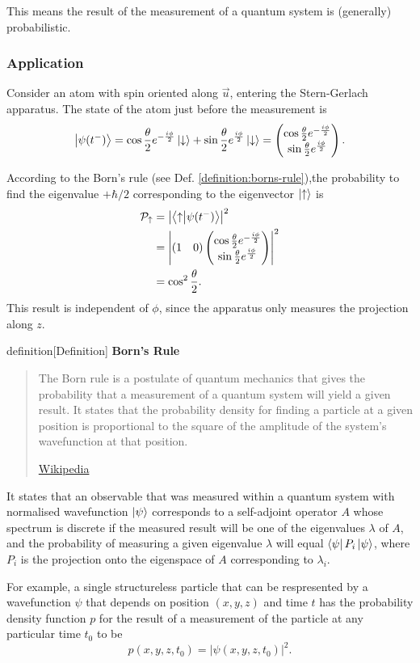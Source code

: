 \documentclass{article}
\begin{document}
This means the result of the measurement of a quantum system is (generally) probabilistic.

\subsubsection{Application}
Consider an atom with spin oriented along $\vec{u}$, entering the Stern-Gerlach apparatus. The state of the atom just before the measurement is
\[
    \ket{\psi (t^-)}=\cos \frac{\theta }{2}e^{-\frac{i\phi }{2}}\ket{\downarrow}+\sin \frac{\theta }{2}e^{\frac{i\phi }{2}}\ket{\downarrow}=\begin{pmatrix}
        \cos \frac{\theta }{2}e^{-\frac{i\phi }{2}} \\
        \sin \frac{\theta }{2}e^{\frac{i\phi }{2}}
    \end{pmatrix}.
\]

According to the Born's rule (see Def. \ref{definition:borns-rule}),the probability to find the eigenvalue $+\hbar/2$ corresponding to the eigenvector $\ket{\uparrow}$ is
\begin{align*}
    \mathcal{P}_{\uparrow} &= \left| \braket{\uparrow}{\psi (t^-)} \right|^2 \\
                           &= \left| (1\quad 0)\begin{pmatrix}
        \cos \frac{\theta }{2}e^{-\frac{i\phi }{2}} \\
        \sin \frac{\theta }{2}e^{\frac{i\phi }{2}}
    \end{pmatrix}\right|^2 \\
                           &=\cos^2 \frac{\theta }{2}.
\end{align*}
This result is independent of $\phi $, since the apparatus only measures the projection along $z$.

\begin{callout}{definition}[Definition]
\label{definition:borns-rule}
\textbf{Born's Rule}
\blockquote[\href{https://en.wikipedia.org/wiki/Born_rule}{Wikipedia}][]{The Born rule is a postulate of quantum mechanics that gives the probability that a measurement of a quantum system will yield a given result. It states that the probability density for finding a particle at a given position is proportional to the square of the amplitude of the system's wavefunction at that position.}

It states that an observable that was measured within a quantum system with normalised wavefunction $\ket{\psi }$ corresponds to a self-adjoint operator $A$ whose spectrum is discrete if the measured result will be one of the eigenvalues $\lambda $ of $A$, and the probability of measuring a given eigenvalue $\lambda $ will equal $\bra{\psi }P_i \ket{\psi }$, where $P_i$ is the projection onto the eigenspace of $A$ corresponding to $\lambda _i$.

For example, a single structureless particle that can be respresented by a wavefunction $\psi $ that depends on position $(x,y,z)$ and time $t$ has the probability density function $p$ for the result of a measurement of the particle at any particular time $t_0$ to be
\[
    p(x,y,z,t_0)=\left| \psi (x,y,z,t_0) \right|^2.
\]
\end{callout}
\end{document}
